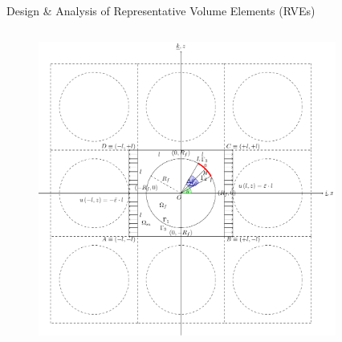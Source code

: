\documentclass[final]{beamer}
\begin{document}
\begin{frame}
\begin{center}
\begin{minipage}{\textwidth}
\begin{exampleblock}{\rule[-0.6ex]{0pt}{50pt}\centering\LARGE Design \& Analysis of Representative Volume Elements (RVEs)}
\begin{columns}
\begin{column}{0.15\textwidth}
\begin{figure}[!h]
   \includegraphics[width=\columnwidth]{periodicRVE_cc.pdf}
\end{figure}
\end{column}
\begin{column}{0.2\textwidth}  %
    \begin{center}
\captionsetup[subfigure]{labelformat=empty}
\begin{figure}[!h]
\centering
    \\

\end{figure}
\end{center}
\end{column}
\end{columns}
\end{exampleblock}
\end{minipage}
\end{center}
\end{frame}
\end{document}

